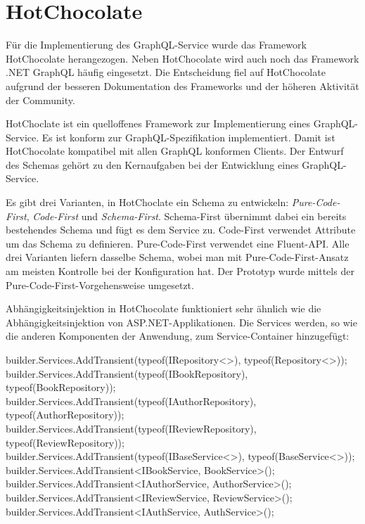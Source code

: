 \section{HotChocolate}
Für die Implementierung des GraphQL-Service wurde das Framework HotChocolate herangezogen.
Neben HotChocolate wird auch noch das Framework .NET GraphQL häufig eingesetzt.
Die Entscheidung fiel auf HotChocolate aufgrund der besseren Dokumentation des Frameworks und der höheren Aktivität der Community.

HotChoclate ist ein quelloffenes Framework zur Implementierung eines GraphQL-Service.
Es ist konform zur GraphQL-Spezifikation implementiert.
Damit ist HotChocolate kompatibel mit allen GraphQL konformen Clients.
Der Entwurf des Schemas gehört zu den Kernaufgaben bei der Entwicklung eines GraphQL-Service.

Es gibt drei Varianten, in HotChoclate ein Schema zu entwickeln: \textit{Pure-Code-First}, \textit{Code-First} und \textit{Schema-First}.
Schema-First übernimmt dabei ein bereits bestehendes Schema und fügt es dem Service zu.
Code-First verwendet Attribute um das Schema zu definieren.
Pure-Code-First verwendet eine Fluent-API.
Alle drei Varianten liefern dasselbe Schema, wobei man mit Pure-Code-First-Ansatz am meisten Kontrolle bei der Konfiguration hat.
Der Prototyp wurde mittels der Pure-Code-First-Vorgehensweise umgesetzt.

Abhängigkeitsinjektion in HotChocolate funktioniert sehr ähnlich wie die Abhängigkeitsinjektion von ASP.NET-Applikationen.
Die Services werden, so wie die anderen Komponenten der Anwendung, zum Service-Container hinzugefügt:

\begin{JsCode}
builder.Services.AddTransient(typeof(IRepository<>), typeof(Repository<>));
builder.Services.AddTransient(typeof(IBookRepository), typeof(BookRepository));
builder.Services.AddTransient(typeof(IAuthorRepository), typeof(AuthorRepository));
builder.Services.AddTransient(typeof(IReviewRepository), typeof(ReviewRepository));
builder.Services.AddTransient(typeof(IBaseService<>), typeof(BaseService<>));
builder.Services.AddTransient<IBookService, BookService>();
builder.Services.AddTransient<IAuthorService, AuthorService>();
builder.Services.AddTransient<IReviewService, ReviewService>();
builder.Services.AddTransient<IAuthService, AuthService>();
\end{JsCode}

